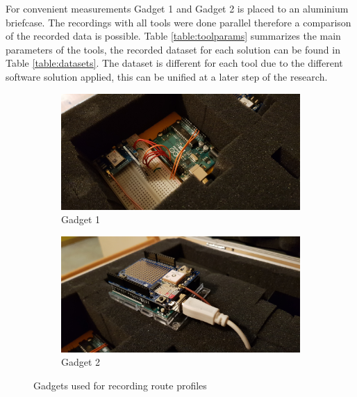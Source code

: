 \documentclass{article}
\begin{document}
			For convenient measurements Gadget 1 and Gadget 2 is placed to an aluminium briefcase. The recordings with all tools were done parallel therefore a comparison of the recorded data is possible. Table \ref{table:toolparams} summarizes the main parameters of the tools, the recorded dataset for each solution can be found in Table \ref{table:datasets}. The dataset is different for each tool due to the different software solution applied, this can be unified at a later step of the research.
			\begin{figure}[h]
		   		\centering
		     	\begin{subfigure}[b]{0.45\textwidth}
		      		\centering
		      	  	\includegraphics[width=\textwidth]{gadget_1.jpg}
		      	   \caption{Gadget 1}
		      	   \label{fig:gadget1}
		     	\end{subfigure}
		     	\begin{subfigure}[b]{0.45\textwidth}
		      	   \centering
		      	   \includegraphics[width=\textwidth]{gadget_2.jpg}
		      	   \caption{Gadget 2}
		      	   \label{fig:gadget2}
		     	\end{subfigure}
		      \caption{Gadgets used for recording route profiles}
		      \label{fig:gadgets}
			\end{figure}		
\end{document}
